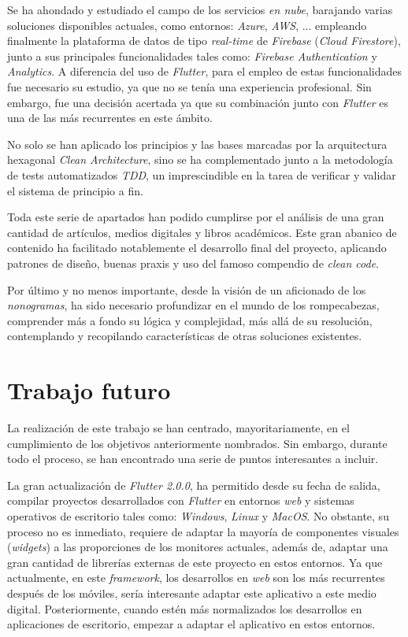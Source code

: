 Se ha ahondado y estudiado el campo de los servicios \textit{en nube}, barajando
varias soluciones disponibles actuales, como entornos: \textit{Azure}, \textit{AWS}, ... empleando finalmente la plataforma de datos
de tipo \textit{real-time} de \textit{Firebase} (\textit{Cloud Firestore}), junto a sus principales funcionalidades
tales como: \textit{Firebase Authentication} y \textit{Analytics}. A diferencia
del uso de \textit{Flutter}, para el empleo de estas funcionalidades fue
necesario su estudio, ya que no se tenía una experiencia profesional. Sin embargo,
fue una decisión acertada ya que su combinación junto con \textit{Flutter} es una 
de las más recurrentes en este ámbito.

No solo se han aplicado los principios y las bases marcadas por la arquitectura hexagonal
\textit{Clean Architecture}, sino se ha complementado junto a la metodología
de tests automatizados \textit{TDD}, un imprescindible en la tarea de
verificar y validar el sistema de principio a fin.

Toda este serie de apartados han podido cumplirse por el análisis de una gran
cantidad de artículos, medios digitales y libros académicos. Este gran abanico
de contenido ha facilitado notablemente el desarrollo final del proyecto,
aplicando patrones de diseño, buenas praxis y uso del famoso compendio de \textit{clean code}.

Por último y no menos importante, desde la visión de un aficionado de los \textit{nonogramas}, ha sido necesario profundizar en el mundo
de los rompecabezas, comprender más a fondo su lógica y complejidad, más allá de su resolución, contemplando
y recopilando características de otras soluciones existentes.

\section{Trabajo futuro}
La realización de este trabajo se han centrado, mayoritariamente, en el cumplimiento de los objetivos
anteriormente nombrados. Sin embargo, durante todo el proceso, se han encontrado una serie de puntos interesantes
a incluir.

La gran actualización de \textit{Flutter 2.0.0}, ha permitido desde su fecha de salida,
compilar proyectos desarrollados con \textit{Flutter} en entornos \textit{web} y
sistemas operativos de escritorio tales como: \textit{Windows}, \textit{Linux} y \textit{MacOS}.
No obstante, su proceso no es inmediato, requiere de adaptar la mayoría de componentes
visuales (\textit{widgets}) a las proporciones de los monitores actuales, además de, adaptar
una gran cantidad de librerías externas de este proyecto en estos entornos.
Ya que actualmente, en este \textit{framework}, los desarrollos en \textit{web} son los más recurrentes después de los móviles,
sería interesante adaptar este aplicativo a este medio digital. Posteriormente, cuando estén
más normalizados los desarrollos en aplicaciones de escritorio, empezar a adaptar el aplicativo en estos
entornos.

